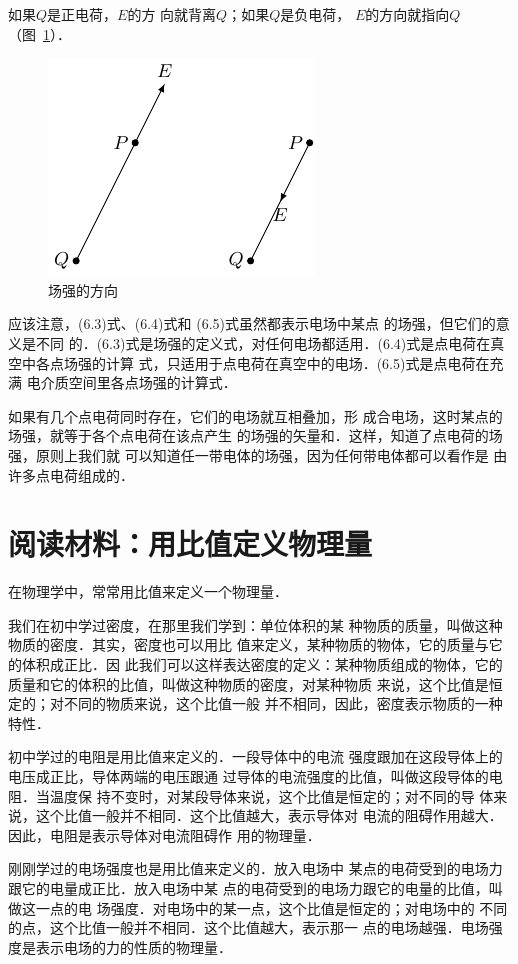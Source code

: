 如果$Q$是正电荷，$E$的方
向就背离$Q$；如果$Q$是负电荷，
$E$的方向就指向$Q$（图~\ref{fig_B_6-5}）．
\begin{figure}[htbp]
    \centering
    \includegraphics{fig/B/6-5.pdf}
    \caption{场强的方向}\label{fig_B_6-5}
\end{figure}

应该注意，(6.3)式、(6.4)式和
(6.5)式虽然都表示电场中某点
的场强，但它们的意义是不同
的．(6.3)式是场强的定义式，对任何电场都适用．(6.4)式是点电荷在真空中各点场强的计算
式，只适用于点电荷在真空中的电场．(6.5)式是点电荷在充满
电介质空间里各点场强的计算式．

如果有几个点电荷同时存在，它们的电场就互相叠加，形
成合电场，这时某点的场强，就等于各个点电荷在该点产生
的场强的矢量和．这样，知道了点电荷的场强，原则上我们就
可以知道任一带电体的场强，因为任何带电体都可以看作是
由许多点电荷组成的．

\section*{阅读材料：用比值定义物理量}
在物理学中，常常用比值来定义一个物理量．

我们在初中学过密度，在那里我们学到：单位体积的某
种物质的质量，叫做这种物质的密度．其实，密度也可以用比
值来定义，某种物质的物体，它的质量与它的体积成正比．因
此我们可以这样表达密度的定义：某种物质组成的物体，它的
质量和它的体积的比值，叫做这种物质的密度，对某种物质
来说，这个比值是恒定的；对不同的物质来说，这个比值一般
并不相同，因此，密度表示物质的一种特性．

初中学过的电阻是用比值来定义的．一段导体中的电流
强度跟加在这段导体上的电压成正比，导体两端的电压跟通
过导体的电流强度的比值，叫做这段导体的电阻．当温度保
持不变时，对某段导体来说，这个比值是恒定的；对不同的导
体来说，这个比值一般并不相同．这个比值越大，表示导体对
电流的阻碍作用越大．因此，电阻是表示导体对电流阻碍作
用的物理量．

刚刚学过的电场强度也是用比值来定义的．放入电场中
某点的电荷受到的电场力跟它的电量成正比．放入电场中某
点的电荷受到的电场力跟它的电量的比值，叫做这一点的电
场强度．对电场中的某一点，这个比值是恒定的；对电场中的
不同的点，这个比值一般并不相同．这个比值越大，表示那一
点的电场越强．电场强度是表示电场的力的性质的物理量．

